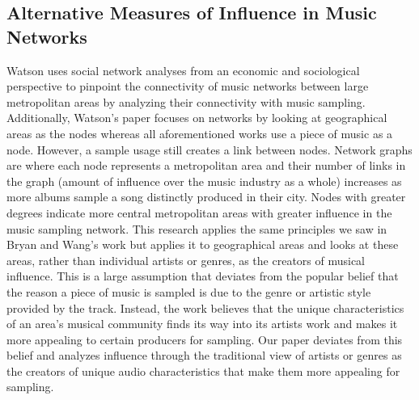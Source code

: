 \documentclass[pageno]{jpaper}
\begin{document}
\subsection{Alternative Measures of Influence in Music Networks}
Watson uses social network analyses from an economic and sociological perspective to pinpoint the connectivity of music networks between large metropolitan areas by analyzing their connectivity with music sampling. \cite{Watson} Additionally, Watson's paper focuses on networks by looking at geographical areas as the nodes whereas all aforementioned works use a piece of music as a node. However, a sample usage still creates a link between nodes. Network graphs are where each node represents a metropolitan area and their number of links in the graph (amount of influence over the music industry as a whole) increases as more albums sample a song distinctly produced in their city. Nodes with greater degrees indicate more central metropolitan areas with greater influence in the music sampling network. This research applies the same principles we saw in Bryan and Wang's work but applies it to geographical areas and looks at these areas, rather than individual artists or genres, as the creators of musical influence. This is a large assumption that deviates from the popular belief that the reason a piece of music is sampled is due to the genre or artistic style provided by the track. Instead, the work believes that the unique characteristics of an area's musical community finds its way into its artists work and makes it more appealing to certain producers for sampling. Our paper deviates from this belief and analyzes influence through the traditional view of artists or genres as the creators of unique audio characteristics that make them more appealing for sampling.
\end{document}
